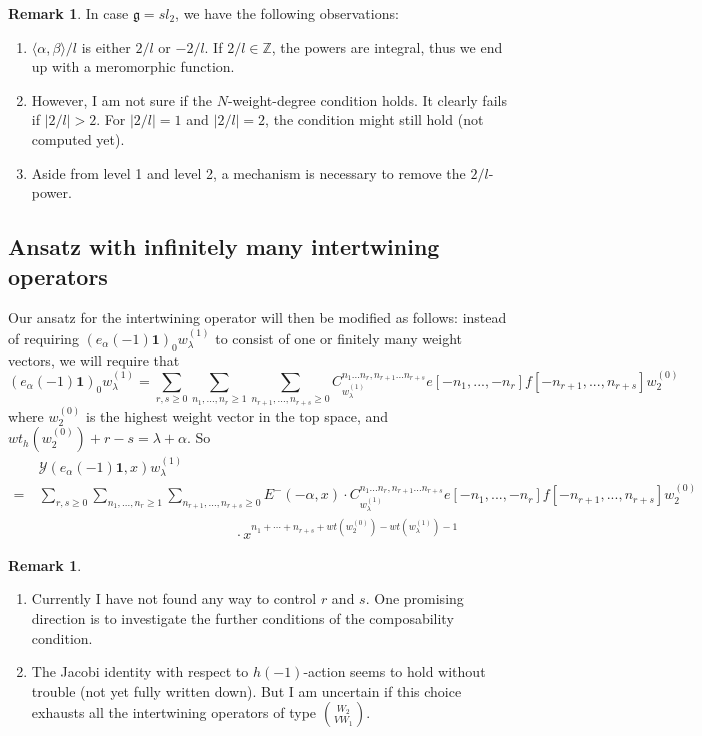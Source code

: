 \documentclass[11pt,oneside,reqno]{amsart}
\theoremstyle{definition}
\newtheorem{rema}[theorem]{Remark}
\newcommand{\Z}{{\mathbb Z}}
\newcommand{\g}{{\mathfrak g}}
\newcommand{\Y}{{\mathcal Y}}
\newcommand{\one}{\mathbf{1}}
\begin{document}
\begin{rema}
    In case $\g=sl_2$, we have the following observations:
    \begin{enumerate}
        \item $\langle \alpha, \beta\rangle / l$ is either $2/l$ or $-2/l$. If $2/l\in \Z$, the powers are integral, thus we end up with a meromorphic function. 
        \item However, I am not sure if the $N$-weight-degree condition holds. It clearly fails if $|2/l|>2$. For $|2/l|=1$ and $|2/l|=2$, the condition might still hold (not computed yet). 
        \item Aside from level 1 and level 2, a mechanism is necessary to remove the $2/l$-power. 
    \end{enumerate}
\end{rema}

\subsection{Ansatz with infinitely many intertwining operators}

Our ansatz for the intertwining operator will then be modified as follows: instead of requiring $(e_\alpha(-1)\one)_0 w_\lambda^{(1)}$ to consist of one or finitely many weight vectors, we will require that 
$$(e_\alpha(-1)\one)_0 w_\lambda^{(1)} = \sum_{r, s\geq 0}\sum_{n_1, ..., n_r \geq 1}\sum_{n_{r+1}, ..., n_{r+s} \geq 0}C_{w_\lambda^{(1)}}^{n_1...n_r, n_{r+1}...n_{r+s}}e[-n_1, ..., -n_r]f[-n_{r+1}, ..., n_{r+s}]w_2^{(0)}$$
where $w_2^{(0)}$ is the highest weight vector in the top space, and $wt_h(w_2^{(0)})+r-s = \lambda + \alpha$. 
So 
\begin{align*}
    & \Y(e_\alpha(-1)\one, x)w_\lambda^{(1)} \\
    = \ & \sum_{r, s\geq 0}\sum_{n_1, ..., n_r \geq 1}\sum_{n_{r+1}, ..., n_{r+s} \geq 0} E^-(-\alpha, x) \cdot C_{w_\lambda^{(1)}}^{n_1...n_r, n_{r+1}...n_{r+s}}e[-n_1, ..., -n_r]f[-n_{r+1}, ..., n_{r+s}]w_2^{(0)}\\
    & \qquad \qquad \qquad \qquad \qquad \qquad \qquad \cdot x^{n_1+\cdots +n_{r+s}+wt(w_2^{(0)})-wt(w_\lambda^{(1)})-1}
\end{align*}
\begin{rema}
    \begin{enumerate}
        \item Currently I have not found any way to control $r$ and $s$. One promising direction is to investigate the further conditions of the composability condition. 
        \item  The Jacobi identity with respect to $h(-1)$-action seems to hold without trouble (not yet fully written down). But I am uncertain if this choice exhausts all the intertwining operators of type $\binom{W_2}{VW_1}$. 
    \end{enumerate}
\end{rema}
\end{document}
